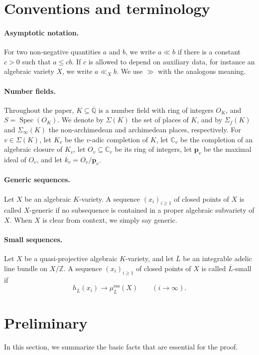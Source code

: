 \documentclass[10pt,a4paper]{amsart}
\theoremstyle{plain}
\theoremstyle{plain}
\numberwithin{equation}{section}
\begin{document}
\section{Conventions and terminology}
\paragraph{Asymptotic notation.}
For two non-negative quantities \(a\) and \(b\), we write \(a\ll b\) if
there is a constant \(c>0\) such that \(a\leq cb\).  If \(c\) is allowed to
depend on auxiliary data, for instance an algebraic variety \(X\), we write
\(a\ll_X b\).  We use \(\gg\) with the analogous meaning.

\paragraph{Number fields.}
Throughout the paper, \(K\subseteq \overline{\mathbb Q}\) is a number field
with ring of integers \(O_K\), and \(S=\operatorname{Spec}(O_K)\).  We denote
by \(\Sigma(K)\) the set of places of \(K\), and by \(\Sigma_f(K)\) and
\(\Sigma_{\infty}(K)\) the non-archimedean and archimedean places,
respectively.  For \(v\in\Sigma(K)\), let \(K_v\) be the \(v\)-adic
completion of \(K\), let \(\mathbb C_v\) be the completion of an algebraic
closure of \(K_v\), let \(O_v\subseteq\mathbb C_v\) be its ring of integers,
let \(\boldsymbol p_v\) be the maximal ideal of \(O_v\), and let
\(k_v=O_v/\boldsymbol p_v\).

\paragraph{Generic sequences.}
Let \(X\) be an algebraic \(K\)-variety.  A sequence
\((x_i)_{i\geq 1}\) of closed points of \(X\) is called \(X\)-generic if no
subsequence is contained in a proper algebraic subvariety of \(X\).  When \(X\)
is clear from context, we simply say generic.

\paragraph{Small sequences.}
Let \(X\) be a quasi-projective algebraic \(K\)-variety, and let
\(\overline L\) be an integrable adelic line bundle on \(X/\mathbb Z\).  A
sequence \((x_i)_{i\geq1}\) of closed points of \(X\) is called
\(\overline L\)-small if
\[
h_{\overline{L}}(x_i)\to\mu^{\mathrm{ess}}_{\overline{L}}(X)
\qquad (i\to \infty).
\]

\section{Preliminary}
In this section, we summarize the basic facts that are essential for the proof.
\end{document}
